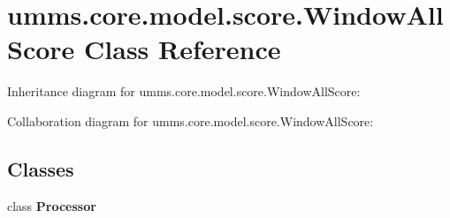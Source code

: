 \hypertarget{classumms_1_1core_1_1model_1_1score_1_1_window_all_score}{\section{umms.\+core.\+model.\+score.\+Window\+All\+Score Class Reference}
\label{classumms_1_1core_1_1model_1_1score_1_1_window_all_score}
}


Inheritance diagram for umms.\+core.\+model.\+score.\+Window\+All\+Score\+:


Collaboration diagram for umms.\+core.\+model.\+score.\+Window\+All\+Score\+:
\subsection*{Classes}
\begin{DoxyCompactItemize}
\item 
class {\bfseries Processor}
\end{DoxyCompactItemize}
